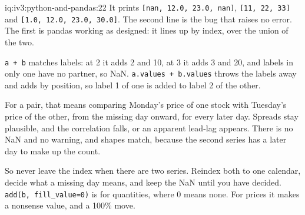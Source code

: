 \begin{solution}{iq:iv3:python-and-pandas:22}
It prints \texttt{[nan, 12.0, 23.0, nan]}, \texttt{[11, 22, 33]} and \texttt{[1.0, 12.0, 23.0, 30.0]}. The second line is the bug that raises no error. The first is pandas working as designed: it lines up by index, over the union of the two.

\texttt{a + b} matches labels: at 2 it adds 2 and 10, at 3 it adds 3 and 20, and labels in only one have no partner, so NaN. \texttt{a.values + b.values} throws the labels away and adds by position, so label 1 of one is added to label 2 of the other.

For a pair, that means comparing Monday's price of one stock with Tuesday's price of the other, from the missing day onward, for every later day. Spreads stay plausible, and the correlation falls, or an apparent lead-lag appears. There is no NaN and no warning, and shapes match, because the second series has a later day to make up the count.

So never leave the index when there are two series. Reindex both to one calendar, decide what a missing day means, and keep the NaN until you have decided. \texttt{add(b, fill\_value=0)} is for quantities, where 0 means none. For prices it makes a nonsense value, and a 100\% move.

\end{solution}


